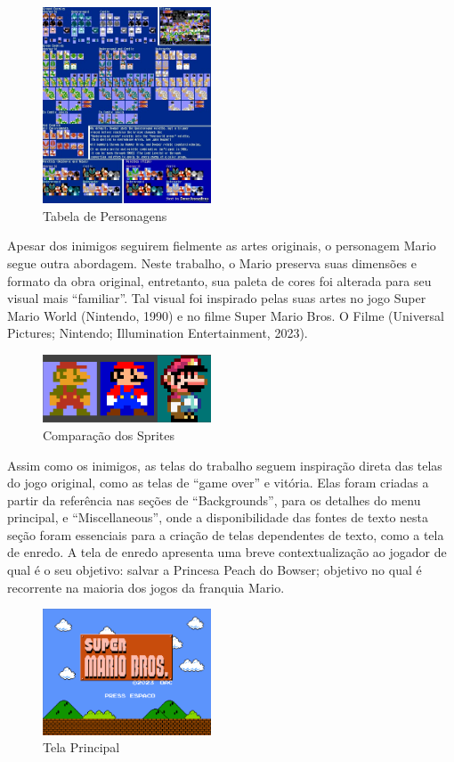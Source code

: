 \documentclass[11pt, twocolumn]{extarticle}
\begin{document}
\begin{figure}[H]
	\centering
	\includegraphics[width=5cm]{figuras/Personagens2.jpeg}
	\caption{Tabela de Personagens}
	\label{image: Tabela de Personagens2}
\end{figure}

Apesar dos inimigos seguirem fielmente as artes originais, o personagem Mario segue outra abordagem. Neste trabalho, o Mario preserva suas dimensões e formato da obra original, entretanto, sua paleta de cores foi alterada para seu visual mais “familiar”. Tal visual foi inspirado pelas suas artes no jogo Super Mario World (Nintendo, 1990) e no filme Super Mario Bros. O Filme (Universal Pictures; Nintendo; Illumination Entertainment, 2023).

\begin{figure}[H]
	\centering
	\includegraphics[width=5cm]{figuras/comparacao_sprites.png}
	\caption{Comparação dos Sprites}
	\label{image: Comparacao dos Sprites}
\end{figure}

Assim como os inimigos, as telas do trabalho seguem inspiração direta das telas do jogo original, como as telas de “game over” e vitória. Elas foram criadas a partir da referência \cite{Sprites} nas seções de “Backgrounds”, para os detalhes do menu principal, e “Miscellaneous”, onde a disponibilidade das fontes de texto nesta seção foram essenciais para a criação de telas dependentes de texto, como a tela de enredo. A tela de enredo apresenta uma breve contextualização ao jogador de qual é o seu objetivo: salvar a Princesa Peach do Bowser; objetivo no qual é recorrente na maioria dos jogos da franquia Mario.

\begin{figure}[H]
	\centering
	\includegraphics[width=5cm]{figuras/menu_principal.png}
	\caption{Tela Principal}
	\label{image: Tela Principal}
\end{figure}
\end{document}
